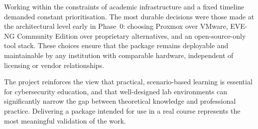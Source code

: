 Working within the constraints of academic infrastructure and a fixed timeline
demanded constant prioritisation. The most durable decisions were those made at the
architectural level early in Phase~0: choosing Proxmox over VMware,
EVE-NG Community Edition over proprietary alternatives, and an open-source-only tool
stack. These choices ensure that the package remains deployable and maintainable
by any institution with comparable hardware, independent of licensing or vendor
relationships.

The project reinforces the view that practical, scenario-based learning is
essential for cybersecurity education, and that well-designed lab environments can
significantly narrow the gap between theoretical knowledge and professional practice.
Delivering a package intended for use in a real course represents the most
meaningful validation of the work.
